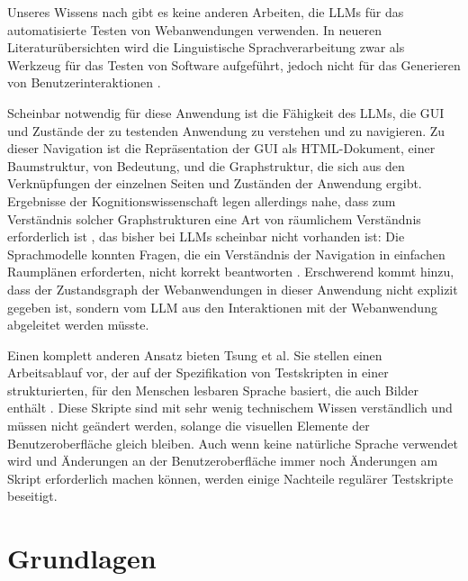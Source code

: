 Unseres Wissens nach gibt es keine anderen Arbeiten, die LLMs für das automatisierte Testen von Webanwendungen verwenden.
In neueren Literaturübersichten wird die Linguistische Sprachverarbeitung zwar als Werkzeug für das Testen von Software aufgeführt, jedoch nicht für das Generieren von Benutzerinteraktionen \cite{implementation_verma_2023, machine_fontes_2021}.

Scheinbar notwendig für diese Anwendung ist die Fähigkeit des LLMs, die GUI und Zustände der zu testenden Anwendung zu verstehen und zu navigieren.
Zu dieser Navigation ist die Repräsentation der GUI als HTML-Dokument, einer Baumstruktur, von Bedeutung, und die Graphstruktur, die sich aus den Verknüpfungen der einzelnen Seiten und Zuständen der Anwendung ergibt.
Ergebnisse der Kognitionswissenschaft legen allerdings nahe, dass zum Verständnis solcher Graphstrukturen eine Art von räumlichem Verständnis erforderlich ist \cite{what_is_a_cognitive_map}, das bisher bei LLMs scheinbar nicht vorhanden ist:
Die Sprachmodelle konnten Fragen, die ein Verständnis der Navigation in einfachen Raumplänen erforderten, nicht korrekt beantworten \cite{cogmaps_llm}.
Erschwerend kommt hinzu, dass der Zustandsgraph der Webanwendungen in dieser Anwendung nicht explizit gegeben ist, sondern vom LLM aus den Interaktionen mit der Webanwendung abgeleitet werden müsste.

Einen komplett anderen Ansatz bieten Tsung et al.
Sie stellen einen Arbeitsablauf vor, der auf der Spezifikation von Testskripten in einer strukturierten, für den Menschen lesbaren Sprache basiert, die auch Bilder enthält \cite{tsung}.
Diese Skripte sind mit sehr wenig technischem Wissen verständlich und müssen nicht geändert werden, solange die visuellen Elemente der Benutzeroberfläche gleich bleiben.
Auch wenn keine natürliche Sprache verwendet wird und Änderungen an der Benutzeroberfläche immer noch Änderungen am Skript erforderlich machen können, werden einige Nachteile regulärer Testskripte beseitigt.

\chapter{Grundlagen}
\label{ch:Foundations}


